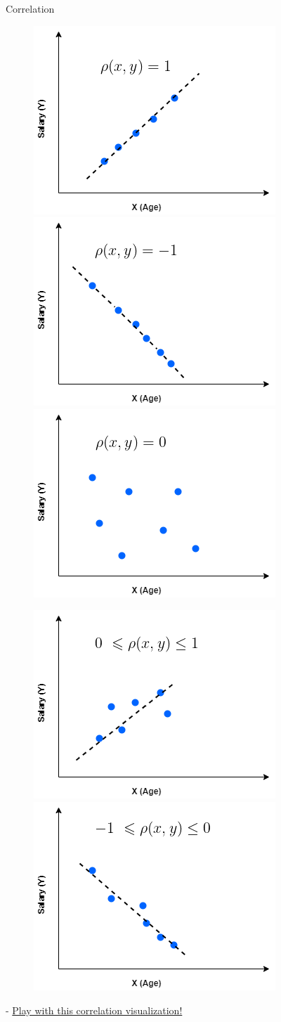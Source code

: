 \documentclass{beamer}
\begin{document}
	\begin{frame}{Correlation}
		\begin{figure}
			\centering
			\includegraphics[width=0.3\linewidth]{screenshot002}
			\includegraphics[width=0.3\linewidth]{screenshot003}
			\includegraphics[width=0.3\linewidth]{screenshot004}
			\label{fig:screenshot004}
		\end{figure}
		\begin{figure}
			\centering
			\includegraphics[width=0.3\linewidth]{0.33}
			\includegraphics[width=0.3\linewidth]{0.34}
			\label{fig:0}
		\end{figure}
		
	\pause
 - \color{blue} \href{https://www.geogebra.org/m/w5q22bzu}{Play with this correlation visualization!}

	\end{frame}
	
\end{document}
